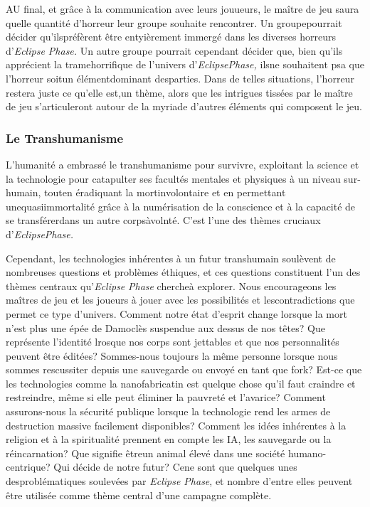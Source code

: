{AU final, et grâce à la communication avec leurs jouueurs, le maître de jeu saura quelle quantité d'horreur leur groupe souhaite rencontrer. Un groupepourrait décider qu'ilspréfèrent être entyièrement immergé dans les diverses horreurs d'\textit{Eclipse Phase.} Un autre groupe pourrait cependant décider que, bien qu'ils apprécient la tramehorrifique de l'univers d'\textit{EclipsePhase,} ilsne souhaitent psa que l'horreur soitun élémentdominant desparties. Dans de telles situations, l'horreur restera juste ce qu'elle est,un thème, alors que les intrigues tissées par le maître de jeu s'articuleront autour de la myriade d'autres éléments qui composent le jeu. 

\subsubsection{Le Transhumanisme} 

L'humanité a embrassé le transhumanisme pour survivre, exploitant la science et la technologie pour catapulter ses facultés mentales et physiques à un niveau sur-humain, touten éradiquant la mortinvolontaire et en permettant unequasiimmortalité grâce à la numérisation de la conscience et à la capacité de se transférerdans un autre corpsàvolnté. C'est l'une des thèmes cruciaux d'\textit{EclipsePhase.} 

Cependant, les technologies inhérentes à un futur transhumain soulèvent de nombreuses questions et problèmes éthiques, et ces questions constituent l'un des thèmes centraux qu'\textit{Eclipse }\textit{Phase} chercheà explorer. Nous encourageons les maîtres de jeu et les joueurs à jouer avec les possibilités et lescontradictions que permet ce type d'univers. Comment notre état d'esprit change lorsque la mort n'est plus une épée de Damoclès suspendue aux dessus de nos têtes? Que représente l'identité lrosque nos corps sont jettables et que nos personnalités peuvent être éditées? Sommes-nous toujours la même personne lorsque nous sommes rescussiter depuis une sauvegarde ou envoyé en tant que fork? Est-ce que les technologies comme la nanofabricatin est quelque chose qu'il faut craindre et restreindre, même si elle peut éliminer la pauvreté et l'avarice? Comment assurons-nous la sécurité publique lorsque la technologie rend les armes de destruction massive facilement disponibles? Comment les idées inhérentes à la religion et à la spiritualité prennent en compte les IA, les sauvegarde ou la réincarnation? Que signifie êtreun animal élevé dans une société humano-centrique? Qui décide de notre futur? Cene sont que quelques unes desproblématiques soulevées par \textit{Eclipse Phase}, et nombre d'entre elles peuvent être utilisée comme thème central d'une campagne complète. 

}
